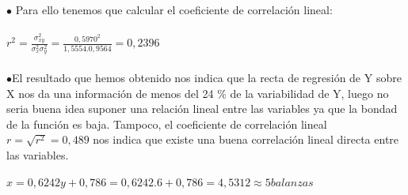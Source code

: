 	
	$\bullet$ Para ello tenemos que calcular el coeficiente de correlación lineal:\\ \\
	
	$r^{2} = \frac{\sigma_{xy}^{2}}{\sigma_{x}^{2}\sigma_{y}^{2}} = \frac{0,5970^{2}}{1,5554 . 0,9564} = 0,2396$\\ \\
 
		$\bullet$El resultado que hemos obtenido nos indica que la recta de regresión de Y sobre X nos da una información de menos
	del 24 \% de la variabilidad de Y, luego no seria buena idea suponer una relación lineal entre las variables ya que la bondad de la función es baja. 
	Tampoco, el coeficiente de correlación lineal $r =\sqrt{r^{2}} = 0,489$ nos indica que existe una buena correlación lineal directa entre las variables. \\ \\
	
\subproblem	
	$x = 0,6242y +  0,786 = 0,6242 . 6 +  0,786 = 4,5312 \approx 5 balanzas $
